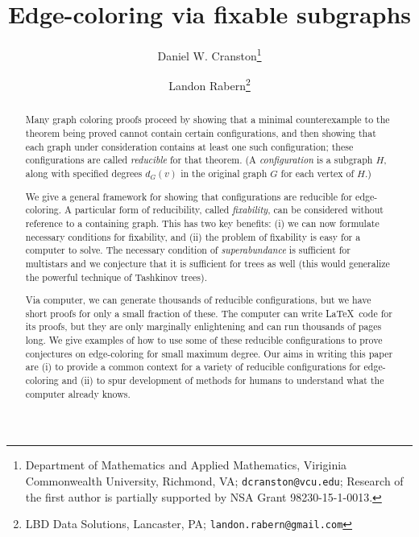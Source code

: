 \documentclass[12pt]{article}
\theoremstyle{plain}
\theoremstyle{definition}
\theoremstyle{remark}
\begin{document}
\title{Edge-coloring via fixable subgraphs}
\author{Daniel W. Cranston\thanks{Department of Mathematics and Applied
Mathematics, Viriginia Commonwealth University, Richmond, VA;
\texttt{dcranston@vcu.edu}; 
Research of the first author is partially supported by NSA Grant
98230-15-1-0013.}
\and
Landon Rabern\thanks{LBD Data Solutions, Lancaster, PA;
\texttt{landon.rabern@gmail.com}}
}
\maketitle

\begin{abstract}
Many graph coloring proofs proceed by showing that a minimal counterexample to
the theorem being proved cannot contain certain configurations, and then
showing that each graph under consideration contains at least one such
configuration; these configurations are called \emph{reducible} for that theorem.
(A \emph{configuration} is a subgraph $H$, along with specified degrees
$d_G(v)$ in the original graph $G$ for each vertex of $H$.)

We give a general framework for showing that configurations are reducible for
edge-coloring.  A particular form of reducibility, called \emph{fixability},
can be considered without reference to a containing graph.  This has two key
benefits: (i) we can now formulate necessary conditions for fixability, and
(ii) the problem of fixability is easy for a computer to solve. The necessary
condition of \emph{superabundance} is sufficient for multistars and we
conjecture that it is sufficient for trees as well (this would generalize the
powerful technique of Tashkinov trees). 

Via computer, we can generate thousands of reducible
configurations, but we have short proofs for only a small fraction of these. 
The computer can write \LaTeX\ code for its proofs, but they are only
marginally enlightening and can run thousands of pages long.  We give examples
of how to use some of these reducible configurations to prove conjectures on
edge-coloring for small maximum degree.  Our aims in writing this paper
are 
(i) to provide a common context for a variety of reducible configurations for
edge-coloring and 
(ii) to spur development of methods for humans to understand what the computer
already knows.
\end{abstract}
\end{document}
